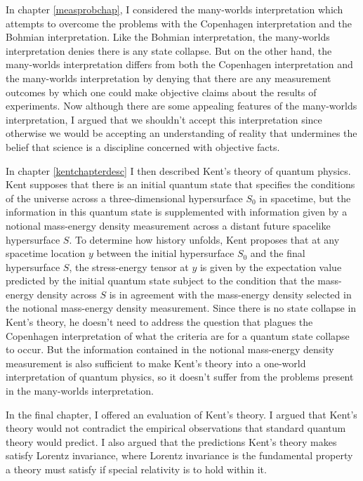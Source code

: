 In chapter \ref{measprobchap}, I considered the many-worlds interpretation which attempts to overcome the problems with the Copenhagen interpretation and the Bohmian interpretation. Like the Bohmian interpretation, the many-worlds interpretation denies there is any state collapse. But on the other hand, the many-worlds interpretation differs from both the Copenhagen interpretation and the many-worlds interpretation by denying that there are any measurement outcomes by which one could make objective claims about the results of experiments. Now although there are some appealing features of the many-worlds interpretation, I argued that we shouldn't accept this interpretation since otherwise we would be accepting an understanding of reality that undermines the belief that science is a discipline concerned with objective facts. 

In chapter \ref{kentchapterdesc} I then described Kent's theory of quantum physics. Kent supposes that there is an initial quantum state that specifies the conditions of the universe across a three-dimensional hypersurface $S_0$ in spacetime, but the information in this quantum state is supplemented with information given by a notional mass-energy density measurement across a distant future spacelike hypersurface $S$. To determine how history unfolds, Kent proposes that at any spacetime location $y$ between the initial hypersurface $S_0$ and the final hypersurface $S$, the stress-energy tensor at $y$ is given by the expectation value predicted by the initial quantum state subject to the condition that the mass-energy density across $S$ is in agreement with the mass-energy density selected in the notional mass-energy density measurement. Since there is no state collapse in Kent's theory, he doesn't need to address the question that plagues the Copenhagen interpretation of what the criteria are for a quantum state collapse to occur. But the information contained in the notional mass-energy density measurement is also sufficient to make Kent's theory into a one-world interpretation of quantum physics, so it doesn't suffer from the problems present in the many-worlds interpretation. 

In the final chapter, I offered an evaluation of Kent's theory. I argued that Kent's theory would not contradict the empirical observations that standard quantum theory would predict. I also argued that the predictions Kent's theory makes satisfy Lorentz invariance, where Lorentz invariance is the fundamental property a theory must satisfy if special relativity is to hold within it. 

